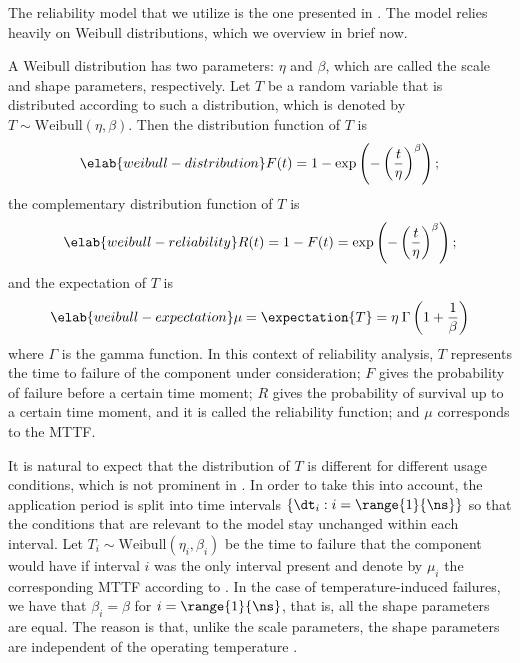 \newcommand{\mean}{\mu}
\newcommand{\scale}{\eta}
\newcommand{\shape}{\beta}

The reliability model that we utilize is the one presented in \cite{huang2009b,
xiang2010}. The model relies heavily on Weibull distributions, which we overview
in brief now.

A Weibull distribution has two parameters: $\scale$ and $\shape$, which are
called the scale and shape parameters, respectively. Let $T$ be a random
variable that is distributed according to such a distribution, which is denoted
by $T \sim \mathrm{Weibull}(\scale, \shape)$. Then the distribution function
\cite{durrett2010} of $T$ is
\begin{equation} \elab{weibull-distribution}
  F(t) = 1 - \exp\left(-\left(\frac{t}{\scale}\right)^\shape\right);
\end{equation}
the complementary distribution function of $T$ is
\begin{equation} \elab{weibull-reliability}
  R(t) = 1 - F(t) = \exp\left(-\left(\frac{t}{\scale}\right)^\shape\right);
\end{equation}
and the expectation of $T$ is
\begin{equation} \elab{weibull-expectation}
  \mean = \expectation{T} = \scale \: \Gamma\left(1 + \frac{1}{\shape}\right)
\end{equation}
where $\Gamma$ is the gamma function. In this context of reliability analysis,
$T$ represents the time to failure of the component under consideration; $F$
gives the probability of failure before a certain time moment; $R$ gives the
probability of survival up to a certain time moment, and it is called the
reliability function; and $\mean$ corresponds to the \ac{MTTF}.

It is natural to expect that the distribution of $T$ is different for different
usage conditions, which is not prominent in . In
order to take this into account, the application period \period is split into
\ns time intervals $\{ \dt_i: i = \range{1}{\ns} \}$ so that the conditions that
are relevant to the model stay unchanged within each interval. Let $T_i \sim
\mathrm{Weibull}(\scale_i, \shape_i)$ be the time to failure that the component
would have if interval $i$ was the only interval present and denote by $\mean_i$
the corresponding \ac{MTTF} according to . In the case
of temperature-induced failures, we have that $\shape_i = \shape$ for $i =
\range{1}{\ns}$, that is, all the shape parameters are equal. The reason is
that, unlike the scale parameters, the shape parameters are independent of the
operating temperature \cite{chang2006}.

